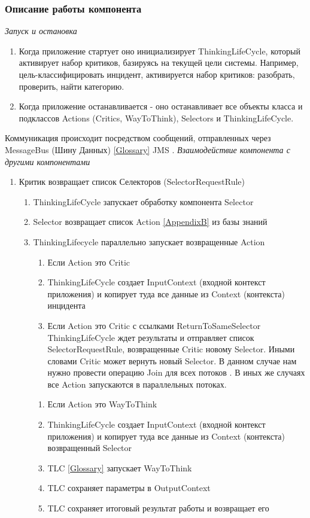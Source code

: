 \subsubsection{Описание работы компонента}
\emph{Запуск и остановка} \\
\begin{enumerate}
	\item Когда приложение стартует оно инициализирует ThinkingLifeCycle, который активирует набор критиков, базируясь на текущей цели системы. Например, цель-классифицировать инцидент, активируется набор критиков: разобрать, проверить, найти категорию.
	\item Когда приложение останавливается - оно останавливает все объекты класса и подклассов Actions (Critics, WayToThink), Selectors и ThinkingLifeCycle.
\end{enumerate}
Коммуникация происходит посредством сообщений, отправленных через MessageBus (Шину Данных) \ref{Glossary} JMS \cite{JMS}.
\emph{Взаимодействие компонента с другими компонентами} \\
\begin{enumerate}
	\item Критик возвращает список Селекторов (SelectorRequestRule)
	\begin{enumerate}
	\item ThinkingLifeCycle запускает обработку компонента Selector
	\item Selector возвращает список Action \ref{AppendixB} из базы знаний
	\item ThinkingLifecycle параллельно запускает возвращенные Action
	\begin{enumerate}
	\item Если Action это Critic
	\item ThinkingLifeCycle создает InputContext (входной контекст приложения) и копирует туда все данные из Context (контекста) инцидента
	\item Если Action это Critic с ссылками ReturnToSameSelector ThinkingLifeCycle ждет результаты и отправляет список SelectorRequestRule, возвращенные Critic новому Selector. Иными словами Critic может вернуть новый Selector. В данном случае нам нужно провести операцию Join для всех потоков \cite{JavaConcurrency}. В иных же случаях все Action запускаются в параллельных потоках.
	\end{enumerate} 
	\begin{enumerate}
	\item Если Action это WayToThink
	\item ThinkingLifeCycle создает InputContext (входной контекст приложения) и копирует туда все данные из Context (контекста) возвращенный Selector
	\item TLC \ref{Glossary} запускает WayToThink
	\item TLC сохраняет параметры в OutputContext
	\item TLC сохраняет итоговый результат работы и возвращает его 
	\end{enumerate} 
	\end{enumerate}
\end{enumerate}
\clearpage
